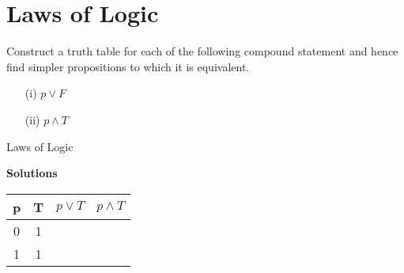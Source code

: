 


\section{Laws of Logic}

Construct a truth table for each of the following compound statement and hence find simpler propositions to which it is equivalent.


\begin{itemize}
\item[(i)] $p \vee F$
\item[(ii)] $p \wedge T$
\end{itemize}


{Laws of Logic}

\textbf{Solutions}
\begin{center}

\begin{tabular}{|c|c||c||c|}
\hline  \phantom{sp}p\phantom{sp}&  \phantom{sp}T\phantom{sp}& $p \vee T$ & $ p \wedge T$ \\ \hline
\hline  0 & 1 &  &  \\ 
\hline  1 &  1 &  &  \\ 
\hline 
\end{tabular} 
\end{center}


